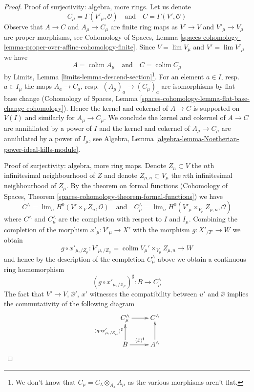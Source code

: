 \documentclass[10pt,a4paper]{amsart}
\theoremstyle{plain}
\theoremstyle{definition}
\theoremstyle{remark}
\numberwithin{equation}{subsection}
\def\lim{\mathop{\mathrm{lim}}\nolimits}
\def\colim{\mathop{\mathrm{colim}}\nolimits}
\begin{document}
\begin{proof}
\medskip\noindent
Proof of surjectivity: algebra, more rings.
Let us denote
$$
C_\mu = \Gamma(V'_\mu, \mathcal{O})
\quad\text{and}\quad
C = \Gamma(V', \mathcal{O})
$$
Observe that $A \to C$ and $A_\mu \to C_\mu$ are finite ring maps as
$V' \to V$ and $V'_\mu \to V_\mu$ are proper morphisms, see
Cohomology of Spaces, Lemma
\ref{spaces-cohomology-lemma-proper-over-affine-cohomology-finite}.
Since $V = \lim V_\mu$ and $V' = \lim V'_\mu$
we have
$$
A = \colim A_\mu
\quad\text{and}\quad
C = \colim C_\mu
$$
by Limits, Lemma \ref{limits-lemma-descend-section}\footnote{We don't
know that $C_\mu = C_\lambda \otimes_{A_\lambda} A_\mu$ as the
various morphisms aren't flat.}. For an element
$a \in I$, resp.\ $a \in I_\mu$ the maps $A_a \to C_a$,
resp.\ $(A_\mu)_a \to (C_\mu)_a$ are isomorphisms by flat base change
(Cohomology of Spaces, Lemma
\ref{spaces-cohomology-lemma-flat-base-change-cohomology}).
Hence the kernel and cokernel of $A \to C$ is supported
on $V(I)$ and similarly for $A_\mu \to C_\mu$.
We conclude the kernel and cokernel of $A \to C$
are annihilated by a power of $I$ and the kernel and cokernel of
$A_\mu \to C_\mu$ are annihilated by a power of $I_\mu$, see
Algebra, Lemma \ref{algebra-lemma-Noetherian-power-ideal-kills-module}.

\medskip\noindent
Proof of surjectivity: algebra, more ring maps.
Denote $Z_n \subset V$ the $n$th infinitesimal
neighbourhood of $Z$ and denote $Z_{\mu, n} \subset V_\mu$
the $n$th infinitesimal neighbourhood of $Z_\mu$.
By the theorem on formal functions
(Cohomology of Spaces, Theorem
\ref{spaces-cohomology-theorem-formal-functions})
we have
$$
C^\wedge = \lim_n H^0(V' \times_V Z_n, \mathcal{O})
\quad\text{and}\quad
C_\mu^\wedge =
\lim_n H^0(V'_\mu \times_{V_\mu} Z_{\mu, n}, \mathcal{O})
$$
where $C^\wedge$ and $C_\mu^\wedge$ are the completion with
respect to $I$ and $I_\mu$.
Combining the completion of the morphism
$x'_\mu : V'_\mu \to X'$ with the morphism $g : X'_{/T'} \to W$ we obtain
$$
g \circ x'_{\mu, /Z_\mu} :
V'_{\mu, /Z_\mu} = \colim V_\mu' \times_{V_\mu} Z_{\mu, n}
\longrightarrow
W
$$
and hence by the description of the completion
$C_\mu^\wedge$ above we obtain a continuous ring homomorphism
$$
(g \circ x'_{\mu, /Z_\mu})^\sharp : B \longrightarrow C_\mu^\wedge
$$
The fact that $V' \to V$, $\hat x'$, $x'$ witnesses the compatibility
between $u'$ and $\hat x$ implies the
commutativity of the following diagram
$$
\xymatrix{
C_\mu^\wedge \ar[r] &
C^\wedge \\
B \ar[u]^{(g \circ x'_{\mu, /Z_\mu})^\sharp} \ar[r]^{(\hat x)^\sharp} &
A^\wedge \ar[u]
}
$$


\end{proof}
\end{document}
